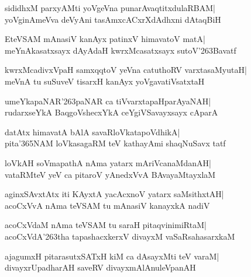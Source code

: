 \documentclass[twoside,12pt,openright]{book}
\newcounter{shloka}[chapter]
\begin{document}
\begin{shloka}%
sididhxM parxyAMti yoVgeVna punarAvaqtitxdulaRBAM|\\
yoVginAmeVva deVyAni tasAmxcACxrXdAdhxni dAtaqBiH
\end{shloka}

\begin{shloka}%
EteVSAM mAnasiV kanAyx patinxV himavatoV matA|\\
meYnAkasatxsayx dAyAdaH kwrxMcasatxsayx sutoV\char'263Bavatf
\end{shloka}

\begin{shloka}%
kwrxMcadivxVpaH samxqqtoV yeVna catuthoRV varxtasaMyutaH|\\
meVnA tu suSuveV tisarxH kanAyx yoVgavatiVsatxtaH
\end{shloka}

\begin{shloka}%
umeYkapaNAR\char'263paNAR ca tiVvarxtapaHparAyaNAH|\\
rudarxseYkA BaqgoVshecxYkA ceYgiVSavayxsayx cAparA
\end{shloka}

\begin{shloka}%
datAtx himavatA bAlA savaRloVkatapoVdhikA|\\
pita\char'365NAM loVkasagaRM teV kathayAmi shaqNuSavx tatf
\end{shloka}

\begin{shloka}%
loVkAH soVmapathA nAma yatarx mAriVcanaMdanAH|\\
vataRMteV yeV ca pitaroV yAnedxVvA BAvayaMtayxlaM
\end{shloka}

\begin{shloka}%
aginxSAvxtAtx iti KAyxtA yacAcxnoV yatarx saMsithxtAH|\\
acoCxVvA nAma teVSAM tu mAnasiV kanayxkA nadiV
\end{shloka}

\begin{shloka}%
acoCxVdaM nAma teVSAM tu saraH pitaqvinimiRtaM|\\
acoCxVdA\char'263tha tapashacxkerxV divayxM vaSaRsahasarxkaM
\end{shloka}

\begin{shloka}%
ajagumxH pitarasutxSATxH kiM ca dAsayxMti teV varaM|\\
divayxrUpadharAH saveRV divayxmAlAnuleVpanAH
\end{shloka}
\end{document}
